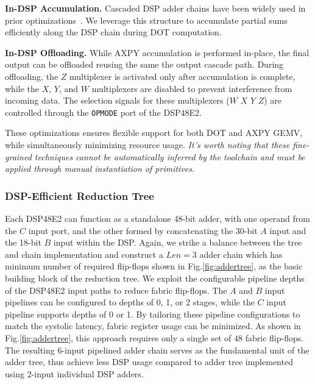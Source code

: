 \documentclass[conference]{IEEEtran}
\begin{document}
\textbf{In-DSP Accumulation.} Cascaded DSP adder chains have been widely used in prior optimizations~\cite{samajdar2019scaling}\cite{wu2017high}. We leverage this structure to accumulate partial sums efficiently along the DSP chain during DOT computation.

\textbf{In-DSP Offloading.} While AXPY accumulation is performed in-place, the final output can be offloaded reusing the same the output cascade path. During offloading, the $Z$ multiplexer is activated only after accumulation is complete, while the $X$, $Y$, and $W$ multiplexers are disabled to prevent interference from incoming data. The selection signals for these multiplexers ($W$ $X$ $Y$ $Z$) are controlled through the \texttt{OPMODE} port of the DSP48E2.

These optimizations ensures flexible support for both DOT and AXPY GEMV, while simultaneously minimizing resource usage. \textit{It's worth noting that these fine-grained techniques cannot be automatically inferred by the toolchain and must be applied through manual instantiation of primitives.}

\subsubsection{\textbf{DSP-Efficient Reduction Tree}}
Each DSP48E2 can function as a standalone 48-bit adder, with one operand from the $C$ input port, and the other formed by concatenating the 30-bit $A$ input and the 18-bit $B$ input within the DSP.
Again, we strike a balance between the tree and chain implementation and construct a $Len=3$ adder chain which has minimum number of required flip-flops shown in Fig.\ref{fig:addertree}, as the basic building block of the reduction tree.
We exploit the configurable pipeline depths of the DSP48E2 input paths to reduce fabric flip-flops. The $A$ and $B$ input pipelines can be configured to depths of 0, 1, or 2 stages, while the $C$ input pipeline supports depths of 0 or 1. By tailoring these pipeline configurations to match the systolic latency, fabric register usage can be minimized. As shown in Fig.\ref{fig:addertree}, this approach requires only a single set of 48 fabric flip-flops. The resulting 6-input pipelined adder chain serves as the fundamental unit of the adder tree, thus achieve less DSP usage compared to adder tree implemented using 2-input individual DSP adders.
\end{document}
